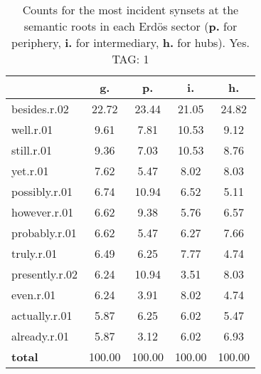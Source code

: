 \begin{table}[h!]
\begin{center}
\begin{tabular}{| l | c | c | c | c |}\hline
 & g. & p. & i. & h. \\\hline
besides.r.02 & 22.72  & 23.44  & 21.05  & 24.82 \\\hline
well.r.01 & 9.61  & 7.81  & 10.53  & 9.12 \\\hline
still.r.01 & 9.36  & 7.03  & 10.53  & 8.76 \\\hline
yet.r.01 & 7.62  & 5.47  & 8.02  & 8.03 \\\hline
possibly.r.01 & 6.74  & 10.94  & 6.52  & 5.11 \\\hline
however.r.01 & 6.62  & 9.38  & 5.76  & 6.57 \\\hline
probably.r.01 & 6.62  & 5.47  & 6.27  & 7.66 \\\hline
truly.r.01 & 6.49  & 6.25  & 7.77  & 4.74 \\\hline
presently.r.02 & 6.24  & 10.94  & 3.51  & 8.03 \\\hline
even.r.01 & 6.24  & 3.91  & 8.02  & 4.74 \\\hline
actually.r.01 & 5.87  & 6.25  & 6.02  & 5.47 \\\hline
already.r.01 & 5.87  & 3.12  & 6.02  & 6.93 \\\hline
{{\bf total}} & 100.00  & 100.00  & 100.00  & 100.00 \\\hline
\end{tabular}
\caption{Counts for the most incident synsets at the semantic roots in each Erd\"os sector ({\bf p.} for periphery, {\bf i.} for intermediary, {\bf h.} for hubs). Yes. TAG: 1}
\end{center}
\end{table}